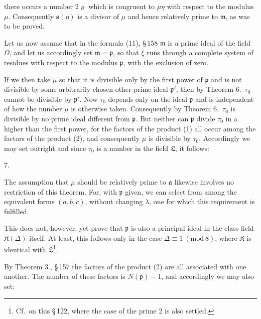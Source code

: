 there occurs a number $2\varrho$ which is congruent to $\mu\eta$ with respect to
 the modulus $\mu$. Consequently $\boldsymbol{s}(\eta)$ is a divisor of $\mu$ and
hence relatively prime to $\mathfrak{m}$, as was to be proved.

Let us now assume that in the formula (11), \S\,158
$\mathfrak{m}$ is a prime ideal of the field $\Omega$, and let us accordingly set
$\mathfrak{m} = \mathfrak{p}$, so that $\xi$ runs through a complete system of residues with
respect to the modulus $\mathfrak{p}$, with the exclusion of zero.

If we then take $\mu$ so that it is divisible only by the first power
of $\mathfrak{p}$ and is not divisible by some arbitrarily chosen other prime ideal
$\mathfrak{p}'$, then by Theorem 6.\ $\tau_0$ cannot be divisible by $\mathfrak{p}'$.
Now $\tau_0$ depends only on the ideal $\mathfrak{p}$ and is independent
of how the number $\mu$ is otherwise taken.
Consequently by Theorem 6.\ $\tau_0$ is divisible by no prime ideal
different from $\mathfrak{p}$. But neither can $\mathfrak{p}$ divide $\tau_0$ in a higher
than the first power, for the factors of the
product (1) all occur among the factors of the product (2),
and consequently $\mu$ is divisible by $\tau_0$. Accordingly we may
set outright
and since $\tau_0$ is a number in the field $\mathfrak{L}$, it follows:

7. 

The assumption that $\mu$ should be relatively prime to $\mathfrak{a}$ likewise
involves no restriction of this theorem. For, with $\mathfrak{p}$ given, we can
select from among the equivalent forms $(a, b, c)$, without changing $\lambda$,
one for which this requirement is fulfilled.

This does not, however, yet prove that $\mathfrak{p}$ is also a principal
ideal in the class field $\mathfrak{K}(\Delta)$ itself. At least, this follows
only in the case $\Delta \equiv 1\ (\mathrm{mod}\ 8)$, where $\mathfrak{K}$ is identical with
$\mathfrak{L}$\footnote{Cf.\ on this \S\,122, where the case of the prime 2 is also settled.}.

By Theorem 3., \S\,157 the factors of the product (2)
are all associated with one another. The number of these factors is
$N(\mathfrak{p}) - 1$, and accordingly we may also set:
